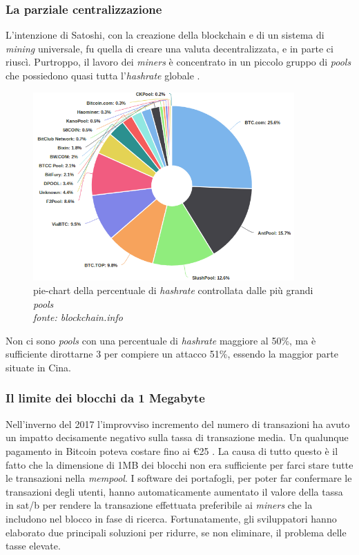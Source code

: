 \documentclass {article}
\begin{document}
\subsubsection {La parziale centralizzazione}


L'intenzione di Satoshi, con la creazione della blockchain e di un sistema di \textit{mining} universale, fu quella di creare una valuta decentralizzata, e in parte ci riuscì.
Purtroppo, il lavoro dei \textit{miners} è concentrato in un piccolo gruppo di \textit{pools} che possiedono quasi tutta l'\textit{hashrate} globale \cite{centralization}.

\vspace {0.5cm}
\begin{figure}[htb!]
\includegraphics [width = 10cm] {pools.png}
\centering
\captionsetup{width=1.4\linewidth}
\caption {pie-chart della percentuale di \textit{hashrate} controllata dalle più grandi \textit{pools}\\\textit{fonte: blockchain.info}}
\end{figure}
\vspace {0.2cm}
\noindent
%
Non ci sono \textit{pools} con una percentuale di \textit{hashrate} maggiore al 50\%, ma è sufficiente dirottarne 3 per compiere un attacco 51\%, essendo la maggior parte situate in Cina.


\subsubsection {Il limite dei blocchi da 1 Megabyte}


Nell'inverno del 2017 l'improvviso incremento del numero di transazioni ha avuto un impatto decisamente negativo sulla tassa di transazione media.
Un qualunque pagamento in Bitcoin poteva costare fino ai \euro{25} \cite{highfees}.
La causa di tutto questo è il fatto che la dimensione di 1MB dei blocchi non era sufficiente per farci stare tutte le transazioni nella \textit{mempool}.
I software dei portafogli, per poter far confermare le transazioni degli utenti, hanno automaticamente aumentato il valore della tassa in sat/b per rendere la transazione effettuata preferibile ai \textit{miners}
 che la includono nel blocco in fase di ricerca.
Fortunatamente, gli sviluppatori hanno elaborato due principali soluzioni per ridurre, se non eliminare, il problema delle tasse elevate.
\end{document}
